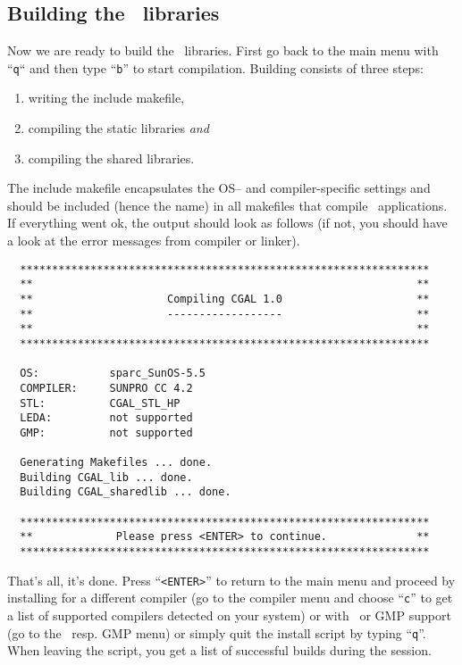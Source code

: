 \subsection{Building the \cgal\ libraries \label{sec:build-the-libs}}

Now we are ready to build the \cgal\ libraries.  First go back to the
main menu with ``\texttt{q}`` and then type ``{\tt b}'' to start
compilation. Building consists of three steps:
\begin{enumerate}
\item writing the include makefile,
\item compiling the static libraries \textit{and}
\item compiling the shared libraries.
\end{enumerate}
The include makefile encapsulates the OS-- and compiler-specific
settings and should be included (hence the name) in all makefiles that
compile \cgal\ applications. If everything went ok, the output should
look as follows (if not, you should have a look at the error messages
from compiler or linker).

\begin{scriptsize}
\begin{verbatim}
  ****************************************************************
  **                                                            **
  **                     Compiling CGAL 1.0                     **
  **                     ------------------                     **
  **                                                            **
  ****************************************************************

  OS:           sparc_SunOS-5.5
  COMPILER:     SUNPRO CC 4.2
  STL:          CGAL_STL_HP
  LEDA:         not supported
  GMP:          not supported

  Generating Makefiles ... done.
  Building CGAL_lib ... done.
  Building CGAL_sharedlib ... done.

  ****************************************************************
  **             Please press <ENTER> to continue.              **
  ****************************************************************
\end{verbatim}
\end{scriptsize}

That's all, it's done. Press ``\texttt{<ENTER>}'' to return to the main
menu and proceed by installing for a different compiler (go to the
compiler menu and choose ``\texttt{c}'' to get a list of supported
compilers detected on your system) or with \leda\ or GMP support (go
to the \leda\ resp.  GMP menu) or simply quit the install script by
typing ``\texttt{q}''. When leaving the script, you get a list of
successful builds during the session.

